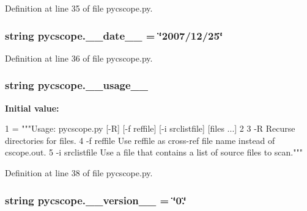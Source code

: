 Definition at line 35 of file pycscope.\-py.

\hypertarget{namespacepycscope_af4accb7da8b3271d0f2ce1d273bbd5de}{
\subsubsection[{\-\_\-\-\_\-date\-\_\-\-\_\-}]{\setlength{\rightskip}{0pt plus 5cm}string pycscope.\-\_\-\-\_\-date\-\_\-\-\_\- = \char`\"{}2007/12/25\char`\"{}}}\label{namespacepycscope_af4accb7da8b3271d0f2ce1d273bbd5de}


Definition at line 36 of file pycscope.\-py.

\hypertarget{namespacepycscope_a5935343cfa1b7b3ed6a6662d8e04f4de}{
\subsubsection[{\-\_\-\-\_\-usage\-\_\-\-\_\-}]{\setlength{\rightskip}{0pt plus 5cm}string pycscope.\-\_\-\-\_\-usage\-\_\-\-\_\-}}\label{namespacepycscope_a5935343cfa1b7b3ed6a6662d8e04f4de}
{\bfseries Initial value\-:}
\begin{DoxyCode}
1 = \textcolor{stringliteral}{"""Usage: pycscope.py [-R] [-f reffile] [-i srclistfile] [files ...]}
2 \textcolor{stringliteral}{}
3 \textcolor{stringliteral}{-R              Recurse directories for files.}
4 \textcolor{stringliteral}{-f reffile      Use reffile as cross-ref file name instead of cscope.out.}
5 \textcolor{stringliteral}{-i srclistfile  Use a file that contains a list of source files to scan."""}
\end{DoxyCode}


Definition at line 38 of file pycscope.\-py.

\hypertarget{namespacepycscope_ad671641244ef639a8ba440baead61e63}{
\subsubsection[{\-\_\-\-\_\-version\-\_\-\-\_\-}]{\setlength{\rightskip}{0pt plus 5cm}string pycscope.\-\_\-\-\_\-version\-\_\-\-\_\- = \char`\"{}0.\char`\"{}}}\label{namespacepycscope_ad671641244ef639a8ba440baead61e63}


